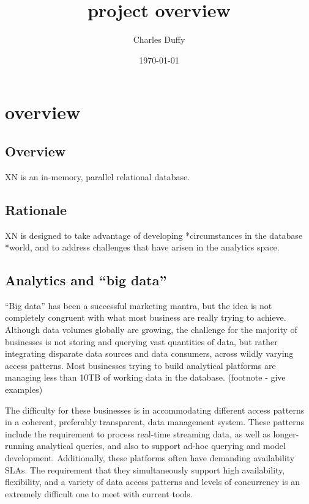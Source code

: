 \documentclass[12pt]{article}
\title{project overview}
\author{Charles Duffy}
\date{\today}
\begin{document}
\maketitle
\section{overview} %

\subsection{Overview}


XN is an in-memory, parallel relational database. 


\subsection{Rationale}

XN is designed to take advantage of developing *circumstances in the database *world, and
to address challenges that have arisen in the analytics space.

\subsection{Analytics and “big data”}

“Big data” has been a successful marketing mantra, but the idea is not completely congruent 
with what most business are really trying to achieve. Although data volumes globally are growing, the challenge
for the majority of businesses is not storing and querying vast quantities of data, but rather integrating disparate data sources
and data consumers, across wildly varying access patterns. Most businesses trying to build analytical platforms
are managing less than 10TB of working data in the database. (footnote - give examples)

The difficulty for these businesses is in accommodating different access patterns in a coherent, preferably
transparent, data management system. These patterns include the requirement to process real-time streaming data, 
as well as longer-running analytical queries, and also to support ad-hoc querying and model development. Additionally, 
these platforms often have demanding availability SLAs. The requirement that they simultaneously support high availability, 
flexibility, and a variety of data access patterns and levels of concurrency is an extremely difficult one to meet with current tools. 
\end{document}
